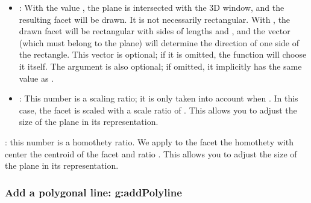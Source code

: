 \begin{itemize}
    \item {}: With the value \nil, the plane is intersected with the 3D window, and the resulting facet will be drawn. It is not necessarily rectangular. With , the drawn facet will be rectangular with sides of lengths  and , and the vector  (which must belong to the plane) will determine the direction of one side of the rectangle. This vector  is optional; if it is omitted, the function will choose it itself. The argument  is also optional; if omitted, it implicitly has the same value as .
    
    \item {}: This number is a scaling ratio; it is only taken into account when . In this case, the facet is scaled with a scale ratio of . This allows you to adjust the size of the plane in its representation.
\end{itemize}



 : this number is a homothety ratio. We apply to the facet the homothety with center the centroid of the facet and ratio . This allows you to adjust the size of the plane in its representation.

\subsubsection{Add a polygonal line: g:addPolyline}

